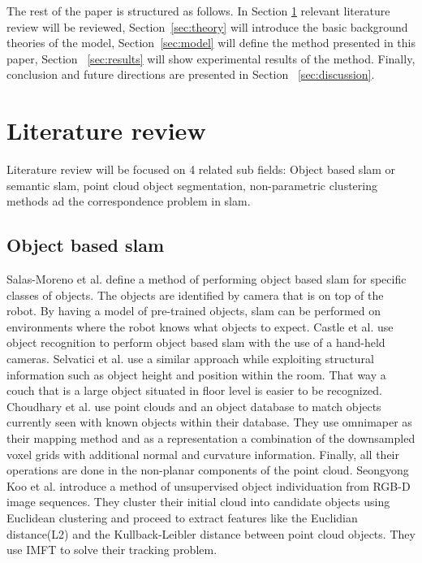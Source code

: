 \documentclass[]{article}
\begin{document}
The rest of the paper is structured as follows. In Section \ref{sec:literature} relevant literature review will be reviewed, Section~\ref{sec:theory} will introduce the basic background theories of the model, Section~\ref{sec:model} will define the method presented in this paper, Section ~\ref{sec:results} will show experimental results of the method. Finally, conclusion and future directions are presented in Section ~\ref{sec:discussion}.

\section{Literature review}
\label{sec:literature}
Literature review will be focused on 4 related sub fields: Object based slam or semantic slam, point cloud object segmentation, non-parametric clustering methods ad the correspondence problem in slam.

\subsection{Object based slam}
Salas-Moreno et al.\cite{slam++} define a method of performing object based slam for specific classes of objects. The objects are identified by camera that is on top of the robot. By having a model of pre-trained objects, slam can be performed on environments where the robot knows what objects to expect. 
Castle et al. use object recognition to perform object based slam with the use of a hand-held cameras. Selvatici et al.\cite{objslam} use a similar approach while exploiting structural information such as object height and position within the room. That way a couch that is a large object situated in floor level is easier to be recognized.
Choudhary et al.\cite{objectpointslam} use point clouds and an object database to match objects currently seen with known objects within their database. They use omnimaper\cite{omnimaper} as their mapping method and as a representation a combination of the downsampled  voxel grids with additional normal and curvature information.  Finally, all their operations are done in the non-planar components of the point cloud.
Seongyong Koo et al.\cite{objectDisc} introduce a method of unsupervised object individuation from RGB-D image sequences. They cluster their initial cloud into candidate objects using Euclidean clustering and proceed to extract features like the Euclidian distance(L2) and the Kullback-Leibler distance between point cloud objects. They use IMFT to solve their tracking problem.
\end{document}
